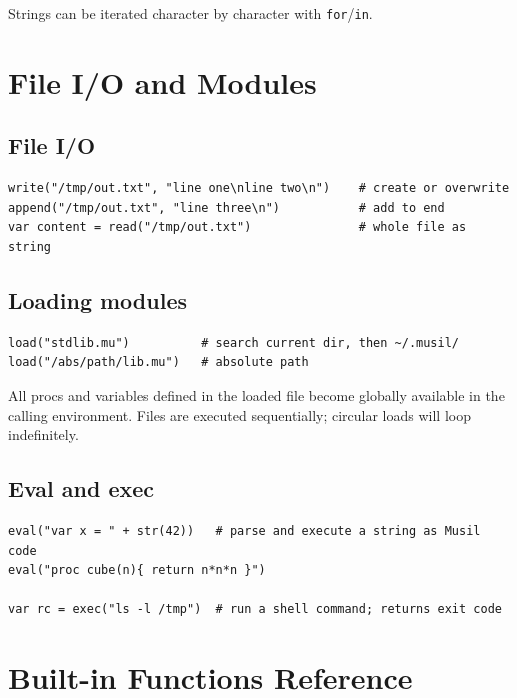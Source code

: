 \documentclass[11pt,a4paper]{article}
\newcommand{\musil}[1]{\lstinline[style=musilinline]{#1}}
\begin{document}
Strings can be iterated character by character with \musil{for}/\musil{in}.

\section{File I/O and Modules}
\label{sec:io}

\subsection{File I/O}

\begin{lstlisting}
write("/tmp/out.txt", "line one\nline two\n")    # create or overwrite
append("/tmp/out.txt", "line three\n")           # add to end
var content = read("/tmp/out.txt")               # whole file as string
\end{lstlisting}

\subsection{Loading modules}

\begin{lstlisting}
load("stdlib.mu")          # search current dir, then ~/.musil/
load("/abs/path/lib.mu")   # absolute path
\end{lstlisting}

All procs and variables defined in the loaded file become globally available
in the calling environment. Files are executed sequentially; circular loads
will loop indefinitely.

\subsection{Eval and exec}

\begin{lstlisting}
eval("var x = " + str(42))   # parse and execute a string as Musil code
eval("proc cube(n){ return n*n*n }")

var rc = exec("ls -l /tmp")  # run a shell command; returns exit code
\end{lstlisting}

\section{Built-in Functions Reference}
\label{sec:builtins}
\end{document}
